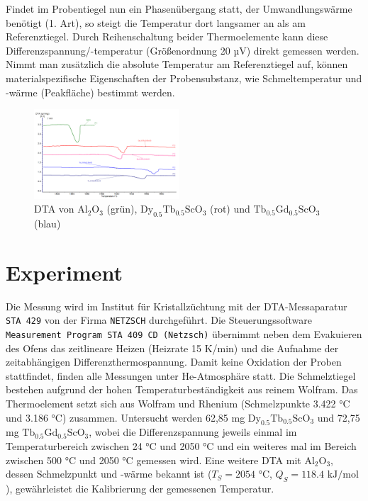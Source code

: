 \documentclass[aps,twocolumn,secnumarabic,nobalancelastpage,amsmath,amssymb,
nofootinbib,superscriptaddress]{revtex4-1}
\begin{document}
Findet im Probentiegel nun ein Phasenübergang statt, der Umwandlungswärme benötigt (1. Art), so steigt die Temperatur dort langsamer an als am Referenztiegel. Durch Reihenschaltung beider
Thermoelemente kann diese Differenzspannung/-temperatur (Größenordnung 20 $\text{µV}$) direkt gemessen werden. Nimmt man zusätzlich die absolute Temperatur am Referenztiegel auf, können materialspezifische Eigenschaften
der Probensubstanz, wie Schmeltemperatur und -wärme (Peakfläche) bestimmt werden.




\begin{figure}[t]
  \centering
  \includegraphics[width=0.48\textwidth]{../img/Messkurven_unsere.png}
  \caption{\label{fig:dtaDyTb+TbGd} DTA von $\text{Al}_{2}\text{O}_3$ (grün), $\text{Dy}_{0.5}\text{Tb}_{0.5}\text{ScO}_3$ (rot)
  und $\text{Tb}_{0.5}\text{Gd}_{0.5}\text{ScO}_3$ (blau)}
\end{figure}

\section{Experiment}
\noindent Die Messung wird im Institut für Kristallzüchtung mit der DTA-Messaparatur \texttt{STA 429} von der Firma \texttt{NETZSCH} durchgeführt. Die Steuerungssoftware
\texttt{Measurement Program STA 409 CD (Netzsch)} übernimmt neben dem Evakuieren des Ofens das zeitlineare Heizen (Heizrate 15 K/min) und die Aufnahme der zeitabhängigen Differenzthermospannung.
Damit keine Oxidation der Proben stattfindet, finden alle Messungen unter He-Atmosphäre statt. Die Schmelztiegel bestehen aufgrund der hohen
Temperaturbeständigkeit aus reinem Wolfram. Das Thermoelement setzt sich aus Wolfram und Rhenium (Schmelzpunkte 3.422 °C und 3.186 °C) zusammen.
Untersucht werden 62,85 mg $\text{Dy}_{0.5}\text{Tb}_{0.5}\text{ScO}_3$ und 72,75 mg $\text{Tb}_{0.5}\text{Gd}_{0.5}\text{ScO}_3$, wobei die Differenzspannung jeweils
einmal im Temperaturbereich zwischen 24 °C und 2050 °C und ein weiteres mal im Bereich zwischen 500 °C und 2050 °C gemessen wird. Eine weitere DTA
mit $\text{Al}_2\text{O}_3$, dessen Schmelzpunkt und -wärme bekannt ist ($T_S=2054\text{ °C}$, $Q_S=118.4\text{ kJ/mol}$), gewährleistet die Kalibrierung der gemessenen Temperatur.
\end{document}

